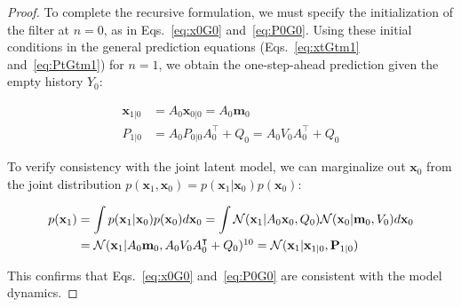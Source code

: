 \begin{proof}
	To complete the recursive formulation, we must specify the initialization
of the filter at $n = 0$, as in Eqs.~\ref{eq:x0G0} and~\ref{eq:P0G0}. Using these
initial conditions in the general prediction equations (Eqs.~\ref{eq:xtGtm1}
and~\ref{eq:PtGtm1}) for $n=1$, we obtain the one-step-ahead prediction given
the empty history $Y_0$:

    \begin{align*}
        \mathbf{x}_{1|0} &= A_0\mathbf{x}_{0|0} = A_0\mathbf{m}_0 \\
        P_{1|0} &= A_0P_{0|0}A_0^\intercal + Q_0 = A_0V_0A_0^\intercal + Q_0
    \end{align*}

	To verify consistency with the joint latent model, we can marginalize out
$\mathbf{x}_0$ from the joint distribution $p(\mathbf{x}_1, \mathbf{x}_0) =
p(\mathbf{x}_1 | \mathbf{x}_0) p(\mathbf{x}_0)$:

    \begin{align}
        p(\mathbf{x}_1) &= \int p(\mathbf{x}_1 | \mathbf{x}_0) p(\mathbf{x}_0) d\mathbf{x}_0 
        = \int \mathcal{N}(\mathbf{x}_1 | A_0\mathbf{x}_0, Q_0) \mathcal{N}(\mathbf{x}_0 | \mathbf{m}_0, V_0) d\mathbf{x}_0 \nonumber\\
        &= \mathcal{N}(\mathbf{x}_1 | A_0\mathbf{m}_0, A_0V_0A_0^\intercal + Q_0)\footnotemark[10] 
        = \mathcal{N}(\mathbf{x}_1 | \mathbf{x}_{1|0}, \mathbf{P}_{1|0}) \nonumber
    \end{align}

    This confirms that Eqs.~\ref{eq:x0G0} and~\ref{eq:P0G0} are consistent with the model dynamics.

\end{proof}

\pagebreak



\pagebreak



\pagebreak


